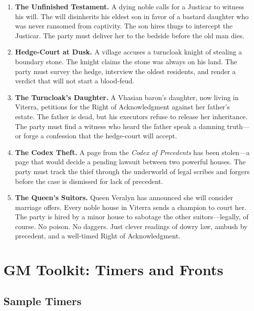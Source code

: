 \documentclass[11pt,twoside]{book}
\newcommand{\ornament}{\par\centering\adforn{36}\par}
\begin{document}
\begin{enumerate}
    \item \textbf{The Unfinished Testament.} A dying noble calls for a Justicar to witness his will. The will disinherits his eldest son in favor of a bastard daughter who was never ransomed from captivity. The son hires thugs to intercept the Justicar. The party must deliver her to the bedside before the old man dies.
    
    \item \textbf{Hedge-Court at Dusk.} A village accuses a turncloak knight of stealing a boundary stone. The knight claims the stone was always on his land. The party must survey the hedge, interview the oldest residents, and render a verdict that will not start a blood-feud.
    
    \item \textbf{The Turncloak's Daughter.} A Vhasian baron's daughter, now living in Viterra, petitions for the Right of Acknowledgment against her father's estate. The father is dead, but his executors refuse to release her inheritance. The party must find a witness who heard the father speak a damning truth---or forge a confession that the hedge-court will accept.
    
    \item \textbf{The Codex Theft.} A page from the \textit{Codex of Precedents} has been stolen---a page that would decide a pending lawsuit between two powerful houses. The party must track the thief through the underworld of legal scribes and forgers before the case is dismissed for lack of precedent.
    
    \item \textbf{The Queen's Suitors.} Queen Veralyn has announced she will consider marriage offers. Every noble house in Viterra sends a champion to court her. The party is hired by a minor house to sabotage the other suitors---legally, of course. No poison. No daggers. Just clever readings of dowry law, ambush by precedent, and a well-timed Right of Acknowledgment.
\end{enumerate}

\ornament

\chapter{GM Toolkit: Timers and Fronts}

\section{Sample Timers}
\end{document}
